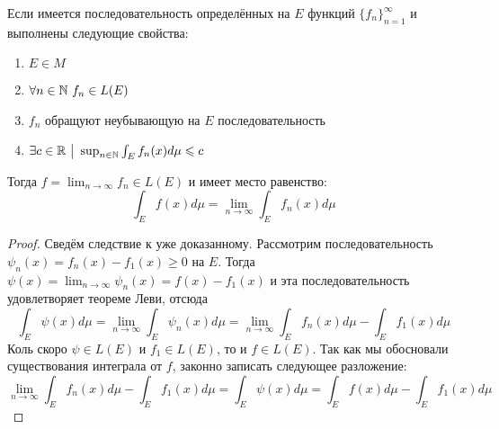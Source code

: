 \begin{corollary}
	Если имеется последовательность определённых на $E$ функций $\{f_n\}_{n = 1}^\infty$ и выполнены следующие свойства:
	\begin{enumerate}
		\item $E \in M$
		
		\item $\forall n \in \mathbb{N}\ f_n \in L(E)$
		
		\item $f_n$ обращуют неубывающую на $E$ последовательность
		
		\item $\exists c \in \mathbb{R} \ \big|\  \sup_{n \in \mathbb{N}} \int_E f_n(x)d\mu \leqslant c$
	\end{enumerate}
	Тогда $f = \lim_{n \to \infty} f_n \in L(E)$ и имеет место равенство:
	\[
		\int_E f(x)d\mu = \lim_{n \to \infty} \int_E f_n(x)d\mu
	\]
\end{corollary}

\begin{proof}
	Сведём следствие к уже доказанному. Рассмотрим последовательность $\psi_n(x) = f_n(x) - f_1(x) \ge 0$ на $E$. Тогда $\psi(x) = \lim_{n \to \infty} \psi_n(x) = f(x) - f_1(x)$ и эта последовательность удовлетворяет теореме Леви, отсюда
	\[
		\int_E \psi(x)d\mu = \lim_{n \to \infty} \int_E \psi_n(x)d\mu = \lim_{n \to \infty} \int_E f_n(x)d\mu - \int_E f_1(x)d\mu
	\]
	Коль скоро $\psi \in L(E)$ и $f_1 \in L(E)$, то и $f \in L(E)$. Так как мы обосновали существования интеграла от $f$, законно записать следующее разложение:
	\[
		\lim_{n \to \infty} \int_E f_n(x)d\mu - \int_E f_1(x)d\mu = \int_E \psi(x)d\mu = \int_E f(x)d\mu - \int_E f_1(x)d\mu
	\]
\end{proof}